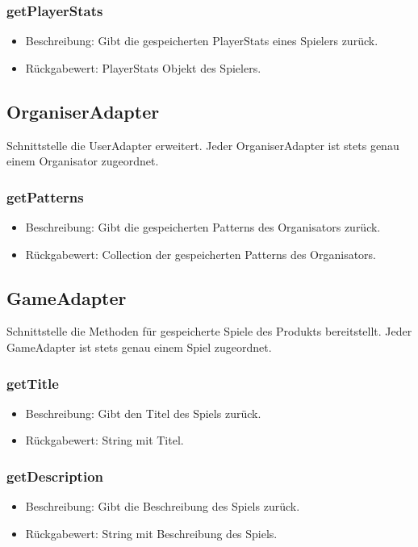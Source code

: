 \documentclass[a4paper]{scrreprt}
\begin{document}
	\subsubsection{getPlayerStats}
	\begin{itemize}
		\item Beschreibung: Gibt die gespeicherten PlayerStats eines Spielers zurück.
		\item Rückgabewert: PlayerStats Objekt des Spielers.
	\end{itemize}
	
	\subsection{OrganiserAdapter}
	Schnittstelle die UserAdapter erweitert.
	Jeder OrganiserAdapter ist stets genau einem Organisator zugeordnet.
	
	\subsubsection{getPatterns}
	\begin{itemize}
		\item Beschreibung: Gibt die gespeicherten Patterns des Organisators zurück.
		\item Rückgabewert: Collection der gespeicherten Patterns des Organisators.
	\end{itemize}
	
	\subsection{GameAdapter}
	Schnittstelle die Methoden für gespeicherte Spiele des Produkts bereitstellt.
	Jeder GameAdapter ist stets genau einem Spiel zugeordnet.
	
	\subsubsection{getTitle}
	\begin{itemize}
		\item Beschreibung: Gibt den Titel des Spiels zurück.
		\item Rückgabewert: String mit Titel.
	\end{itemize}
	
	\subsubsection{getDescription}
	\begin{itemize}
		\item Beschreibung: Gibt die Beschreibung des Spiels zurück.
		\item Rückgabewert: String mit Beschreibung des Spiels.
	\end{itemize}
	
\end{document}
